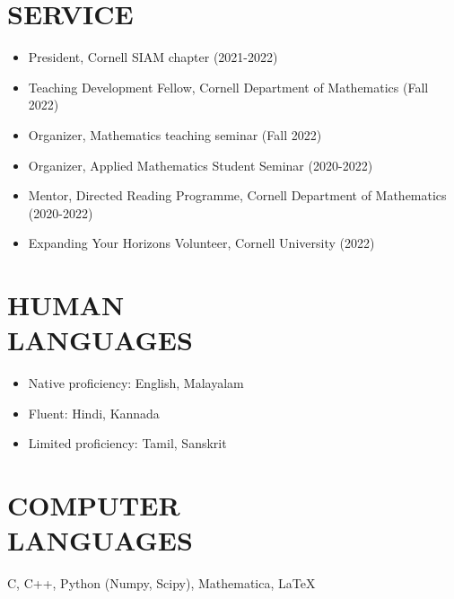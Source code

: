 \documentclass[margin]{res} %
\begin{document}
\begin{resume}
\section{SERVICE}
\begin{itemize}
	\item President, Cornell SIAM chapter (2021-2022)
	\item Teaching Development Fellow, Cornell Department of Mathematics (Fall 2022)
	\item Organizer, Mathematics teaching seminar (Fall 2022)
	\item Organizer, Applied Mathematics Student Seminar (2020-2022)
	\item Mentor, Directed Reading Programme, Cornell Department of Mathematics (2020-2022)
	\item Expanding Your Horizons Volunteer, Cornell University (2022)
\end{itemize}

\section{HUMAN \\ LANGUAGES}
\begin{itemize}
	\item Native proficiency: English, Malayalam
	\item Fluent: Hindi, Kannada
	\item Limited proficiency: Tamil, Sanskrit
\end{itemize}

\section{COMPUTER \\ LANGUAGES}
C, C++, Python (Numpy, Scipy), Mathematica, \LaTeX

\end{resume}
\end{document}
